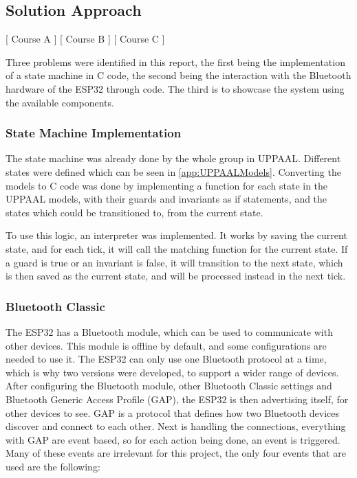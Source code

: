 \subsection{Solution Approach}
[ Course A ] [ Course B ] [ Course C ] 
\newline

Three problems were identified in this report, the first being the implementation of a state machine in C code, the second being the interaction with the Bluetooth hardware of the ESP32 through code.
The third is to showcase the system using the available components.

\subsubsection{State Machine Implementation}
The state machine was already done by the whole group in UPPAAL.
Different states were defined which can be seen in \ref{app:UPPAALModels}.
Converting the models to C code was done by implementing a function for each state in the UPPAAL models, with their guards and invariants as if statements, and the states which could be transitioned to, from the current state.

To use this logic, an interpreter was implemented.
It works by saving the current state, and for each tick, it will call the matching function for the current state.
If a guard is true or an invariant is false, it will transition to the next state, which is then saved as the current state, and will be processed instead in the next tick.

\subsubsection{Bluetooth Classic}
The ESP32 has a Bluetooth module, which can be used to communicate with other devices.
This module is offline by default, and some configurations are needed to use it.
The ESP32 can only use one Bluetooth protocol at a time, which is why two versions were developed, to support a wider range of devices.
After configuring the Bluetooth module, other Bluetooth Classic settings and Bluetooth Generic Access Profile (GAP), the ESP32 is then advertising itself, for other devices to see.
GAP is a protocol that defines how two Bluetooth devices discover and connect to each other.
Next is handling the connections, everything with GAP are event based, so for each action being done, an event is triggered.
Many of these events are irrelevant for this project, the only four events that are used are the following:
\newline

